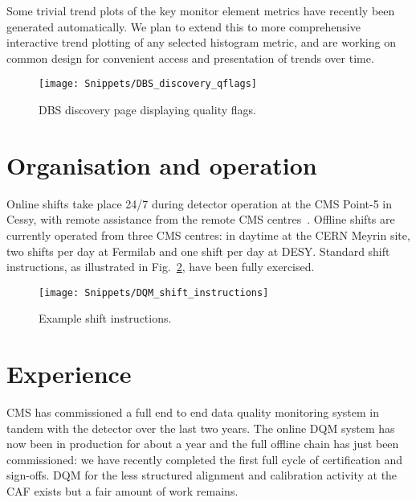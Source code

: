 \documentclass[a4paper]{jpconf}
\begin{document}
Some trivial trend plots of the key monitor element metrics have recently
been generated automatically.  We plan to extend this to more comprehensive
interactive trend plotting of any selected histogram metric, and are working
on common design for convenient access and presentation of trends over time.

\begin{figure}[!tbp]
\begin{center}
\texttt{[image: Snippets/DBS\_discovery\_qflags]}
\caption{\label{fig:dbsqflags}DBS discovery page displaying quality flags.}
\end{center}
\end{figure}


\section{Organisation and operation}

Online shifts take place 24/7 during detector operation at the CMS Point-5 in
Cessy, with remote assistance from the remote CMS
centres~\cite{cms_centres_09,collaboration_at_distance_09}.  Offline shifts
are currently operated from three CMS centres: in daytime at the CERN Meyrin
site, two shifts per day at Fermilab and one shift per day at DESY.  Standard
shift instructions, as illustrated in Fig.~\ref{fig:shiftdoc}, have been
fully exercised.

\begin{figure}[!tbp]
\begin{center}
\texttt{[image: Snippets/DQM\_shift\_instructions]}
\caption{\label{fig:shiftdoc}Example shift instructions.}
\end{center}
\end{figure}


\section{Experience}

CMS has commissioned a full end to end data quality monitoring system in
tandem with the detector over the last two years.  The online DQM system has
now been in production for about a year and the full offline chain has just
been commissioned: we have recently completed the first full cycle of
certification and sign-offs.  DQM for the less structured alignment and
calibration activity at the CAF exists but a fair amount of work remains.
\end{document}
